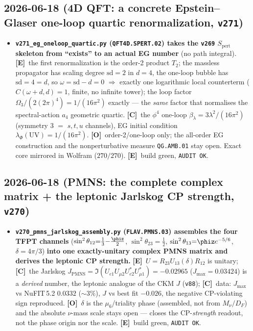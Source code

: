 \documentclass[11pt]{article}
\providecommand{\mE}{\textbf{[E]}}\providecommand{\mC}{\textbf{[C]}}
\providecommand{\mO}{\textbf{[O]}}\providecommand{\mX}{\textbf{[X]}}
\providecommand{\vref}[1]{\texttt{#1}}
\begin{document}
\subsection*{2026-06-18 (4D QFT: a concrete Epstein--Glaser one-loop quartic renormalization, \texttt{v271})}
\begin{itemize}
\item \textbf{\texttt{v271\_eg\_oneloop\_quartic.py} (\texttt{QFT4D.SPERT.02}) takes the \vref{v269} $S_{\mathrm{pert}}$
  skeleton from ``exists'' to an actual EG number} (no path integral). \mE\ the first renormalization is the
  order-2 product $T_2$; the massless propagator has scaling degree $\mathrm{sd}{=}2$ in $d{=}4$, the one-loop
  bubble has $\mathrm{sd}{=}4{=}d$, so $\omega{=}\mathrm{sd}{-}d{=}0$ $\Rightarrow$ exactly one logarithmic local
  counterterm ($C(\omega{+}d,d){=}1$, finite, no infinite tower); the loop factor $\Omega_3/(2(2\pi)^4)=1/(16\pi^2)$
  exactly --- the \emph{same} factor that normalises the spectral-action $a_4$ geometric quartic. \mC\ the
  $\phi^4$ one-loop $\beta_\lambda=3\lambda^2/(16\pi^2)$ (symmetry $3$ $=$ $s,t,u$ channels), EG initial condition
  $\lambda_\Phi(\mathrm{UV})=1/(16\pi^2)$. \mO\ order-2/one-loop only; the all-order EG construction and the
  nonperturbative measure \texttt{QG.AMB.01} stay open. Exact core mirrored in Wolfram ($270/270$). \mE\ build
  green, \texttt{AUDIT OK}.
\end{itemize}

\subsection*{2026-06-18 (PMNS: the complete complex matrix + the leptonic Jarlskog CP strength, \texttt{v270})}
\begin{itemize}
\item \textbf{\texttt{v270\_pmns\_jarlskog\_assembly.py} (\texttt{FLAV.PMNS.03}) assembles the four TFPT
  channels} ($\sin^2\theta_{12}{=}\tfrac13{-}\tfrac{\phiz}2$, $\sin^2\theta_{23}{=}\tfrac12$,
  $\sin^2\theta_{13}{=}\phiz e^{-5/6}$, $\delta{=}4\pi/3$) \textbf{into one exactly-unitary complex PMNS
  matrix and derives the leptonic CP strength.} \mE\ $U=R_{23}U_{13}(\delta)R_{12}$ is unitary; \mC\ the
  Jarlskog $J_{\mathrm{PMNS}}=\Im(U_{e1}U_{\mu2}U_{e2}^{*}U_{\mu1}^{*})=-0.02965$ ($J_{\max}=0.03424$) is a
  \emph{derived} number, the leptonic analogue of the CKM $J$ (\vref{v88}); \mC\ data: $J_{\max}$ vs NuFIT\,5.2
  $0.0332$ ($\sim3\%$), $J$ vs best fit $-0.026$, the negative CP-violating sign reproduced. \mO\ $\delta$ is
  the $\mu_6$/triality phase (assembled, not from $M_\nu/D_F$) and the absolute $\nu$-mass scale stays open ---
  closes the CP-\emph{strength} readout, not the phase origin nor the scale. \mE\ build green, \texttt{AUDIT OK}.
\end{itemize}
\end{document}
